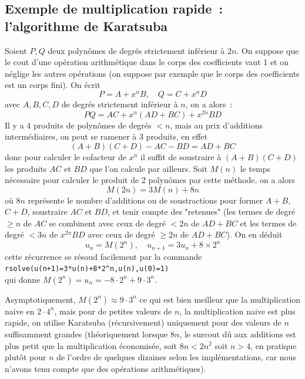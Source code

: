 \documentclass[a4paper,11pt]{book}
\begin{document}
\begin{giacjshere}
\subsection{Exemple de multiplication rapide~: l'algorithme de Karatsuba}
Soient $P, Q$ deux polyn\^omes de degr\'es strictement inf\'erieur \`a
$2n$. On suppose que le cout d'une op\'eration arithm\'etique dans le
corps des coefficients vaut 1 et on n\'eglige les autres
op\'erations (on suppose par exemple que le corps des coefficients
est un corps fini). On \'ecrit
\[ P=A+x^n B, \quad Q=C+x^n D\]
avec $A,B,C,D$ de degr\'es strictement inf\'erieur \`a $n$, on a
alors~:
$$ P Q = AC + x^n(AD+BC)+x^{2n} BD$$
Il y a 4 produits de polyn\^omes de degr\'es $<n$, mais au prix
d'additions interm\'ediaires, on peut se ramener \`a 3 produits, en
effet
$$ (A+B)(C+D)-AC-BD = AD+BC$$
donc pour calculer le cofacteur de $x^n$ il suffit de soustraire
\`a $(A+B)(C+D)$ les produits $AC$ et $BD$ que l'on calcule par
ailleurs.
Soit $M(n)$ le temps n\'ecessaire pour calculer le produit de 2
polyn\^omes par cette m\'ethode, on a alors
$$ M(2n) = 3M(n)+ 8n$$
o\`u $8n$ repr\'esente le nombre d'additions ou de soustractions
pour former $A+B$, $C+D$, soustraire $AC$ et $BD$, et tenir compte
des "retenues" (les termes de degr\'e $\geq n$ de $AC$ se combinent
avec ceux de degr\'e $<2n$ de $AD+BC$ et les termes de degr\'e $< 3n$
de $x^{2n}BD$ avec ceux de degr\'e $\geq 2n$ de $AD+BC$).
On en d\'eduit
$$ u_n=M(2^n), \quad u_{n+1}=3u_n+8 \times 2^n $$ 
cette r\'ecurrence se r\'esoud facilement par la commande\\
\verb|rsolve(u(n+1)=3*u(n)+8*2^n,u(n),u(0)=1)|\\
qui donne $M(2^n)=u_n=-8\cdot 2^{n}+9\cdot 3^{n}$.

Asymptotiquement, $M(2^n) \approx 9\cdot 3^{n}$ ce qui est bien
meilleur que la multiplication naive en $2 \cdot 4^n$, mais pour de
petites valeurs de $n$, la multiplication naive est plus rapide, on
utilise Karatsuba (r\'ecursivement) uniquement pour des valeurs de $n$
suffisamment grandes (th\'eoriquement lorsque $8n$, le surcout d\^u
aux additions est plus petit que la multiplication \'economis\'ee,
soit $8n<2n^2$ soit $n>4$, en pratique plut\^ot pour $n$ de l'ordre de quelques
dizaines selon les impl\'ementations, car nous n'avons tenu compte
que des op\'erations arithm\'etiques).


\end{giacjshere}
\end{document}
